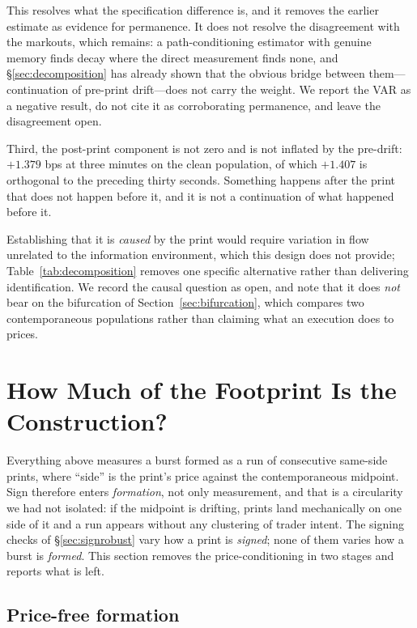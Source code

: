 \documentclass[11pt]{article}
\begin{document}
This resolves what the specification difference is, and it removes the earlier estimate as
evidence for permanence. It does not resolve the disagreement with the markouts, which
remains: a path-conditioning estimator with genuine memory finds decay where the direct
measurement finds none, and \S\ref{sec:decomposition} has already shown that the obvious
bridge between them---continuation of pre-print drift---does not carry the weight. We report
the VAR as a negative result, do not cite it as corroborating permanence, and leave the
disagreement open.

Third, the post-print component is not zero and is not inflated by the pre-drift: $+1.379$
bps at three minutes on the clean population, of which $+1.407$ is orthogonal to the
preceding thirty seconds. Something happens after the print that does not happen before it,
and it is not a continuation of what happened before it.

Establishing that it is \emph{caused} by the print would require variation in flow unrelated
to the information environment, which this design does not provide;
Table~\ref{tab:decomposition} removes one specific alternative rather than delivering
identification. We record the causal question as open, and note that it does \emph{not} bear
on the bifurcation of Section~\ref{sec:bifurcation}, which compares two contemporaneous
populations rather than claiming what an execution does to prices.

\section{How Much of the Footprint Is the Construction?}
\label{sec:construction}

Everything above measures a burst formed as a run of consecutive same-side prints, where
``side'' is the print's price against the contemporaneous midpoint. Sign therefore enters
\emph{formation}, not only measurement, and that is a circularity we had not isolated: if the
midpoint is drifting, prints land mechanically on one side of it and a run appears without any
clustering of trader intent. The signing checks of \S\ref{sec:signrobust} vary how a print is
\emph{signed}; none of them varies how a burst is \emph{formed}. This section removes the
price-conditioning in two stages and reports what is left.

\subsection{Price-free formation}
\end{document}
